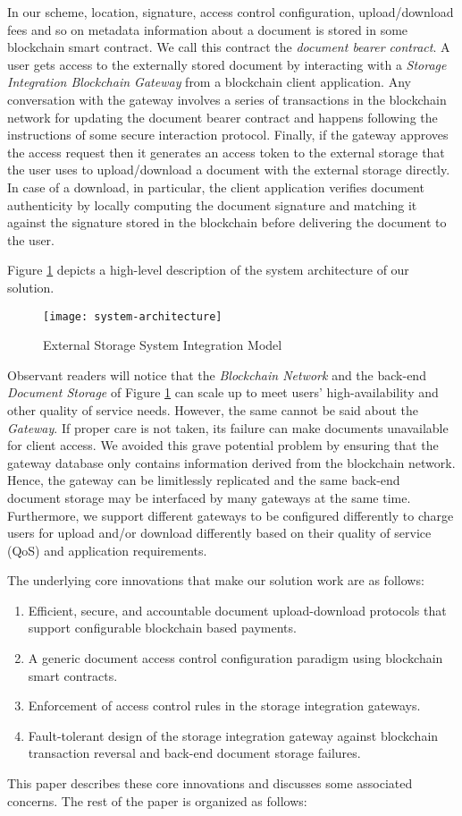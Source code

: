 In our scheme, location, signature, access control configuration, upload/download fees and so on metadata information about a document is stored in some blockchain smart contract. We call this contract the {\it document bearer contract}. A user gets access to the externally stored document by interacting with a \textit{Storage Integration Blockchain Gateway} from a blockchain client application. Any conversation with the gateway involves a series of transactions in the blockchain network for updating the document bearer contract and happens following the instructions of some secure interaction protocol. Finally, if the gateway approves the access request then it generates an access token to the external storage that the user uses to upload/download a document with the external storage directly. In case of a download, in particular, the client application verifies document authenticity by locally computing the document signature and matching it against the signature stored in the blockchain before delivering the document to the user. 

Figure \ref{fig-1} depicts a high-level description of the system architecture of our solution.   
\begin{figure}[h]
\label{fig-1}
\centering
\texttt{[image: system-architecture]}                    
\caption{External Storage System Integration Model}
\end{figure}
Observant readers will notice that the \textit{Blockchain Network} and the back-end \textit{Document Storage} of Figure \ref{fig-1} can scale up to meet users' high-availability and other quality of service needs. However, the same cannot be said about the \textit{Gateway}. If proper care is not taken, its failure can make documents unavailable for client access. We avoided this grave potential problem by ensuring that the gateway database only contains information derived from the blockchain network. Hence, the gateway can be limitlessly replicated and the same back-end document storage may be interfaced by many gateways at the same time. Furthermore, we support different gateways to be configured differently to charge users for upload and/or download differently based on their quality of service (QoS) and application requirements.

The underlying core innovations that make our solution work are as follows:
\begin{enumerate}
\item Efficient, secure, and accountable document upload-download protocols that support configurable blockchain based payments.
\item A generic document access control configuration paradigm using blockchain smart contracts. 
\item Enforcement of access control rules in the storage integration gateways.
\item Fault-tolerant design of the storage integration gateway against blockchain transaction reversal and back-end document storage failures.   
\end{enumerate}         
This paper describes these core innovations and discusses some associated concerns. The rest of the paper is organized as follows:

